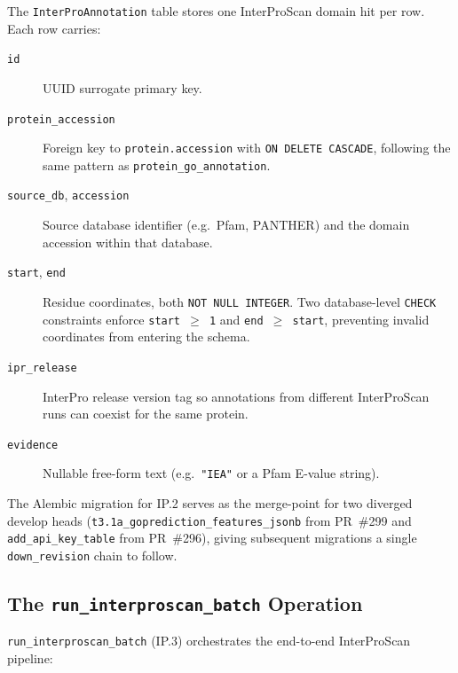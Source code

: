 The \texttt{InterProAnnotation} table stores one InterProScan domain hit per row.
Each row carries:

\begin{description}
  \item[\texttt{id}] UUID surrogate primary key.
  \item[\texttt{protein\_accession}] Foreign key to \texttt{protein.accession}
    with \texttt{ON DELETE CASCADE}, following the same pattern as
    \texttt{protein\_go\_annotation}.
  \item[\texttt{source\_db}, \texttt{accession}] Source database identifier
    (e.g.\ Pfam, PANTHER) and the domain accession within that database.
  \item[\texttt{start}, \texttt{end}] Residue coordinates, both \texttt{NOT NULL
    INTEGER}. Two database-level \texttt{CHECK} constraints enforce
    \texttt{start $\geq$ 1} and \texttt{end $\geq$ start}, preventing
    invalid coordinates from entering the schema.
  \item[\texttt{ipr\_release}] InterPro release version tag so annotations
    from different InterProScan runs can coexist for the same protein.
  \item[\texttt{evidence}] Nullable free-form text (e.g.\ \texttt{"IEA"} or a
    Pfam E-value string).
\end{description}

The Alembic migration for IP.2 serves as the merge-point for two diverged
develop heads (\texttt{t3.1a\_goprediction\_features\_jsonb} from PR~\#299
and \texttt{add\_api\_key\_table} from PR~\#296), giving subsequent migrations
a single \texttt{down\_revision} chain to follow.

\subsection{The \texttt{run\_interproscan\_batch} Operation}
\label{subsec:run-interproscan}

\texttt{run\_interproscan\_batch} (IP.3) orchestrates the end-to-end InterProScan
pipeline:

